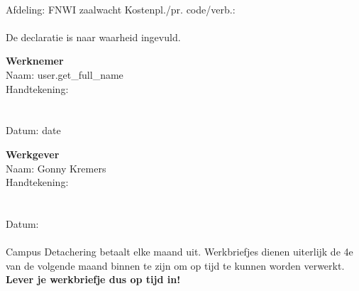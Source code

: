 \documentclass[a4paper,twoside]{article}
\begin{document}
		\paragraph{}

			Afdeling: FNWI zaalwacht Kostenpl./pr. code/verb.:

		\paragraph{}

			De declaratie is naar waarheid ingevuld.

			\begin{multicols}{2}
				\textbf{Werknemer}
				\\
				Naam: {{ user.get_full_name }}
				\\
				Handtekening:
				\\
				\\
				\\
				Datum: {{ date }}

			\columnbreak
				\textbf{Werkgever}
				\\
				Naam: Gonny Kremers
				\\
				Handtekening:
				\\
				\\
				\\
				Datum:

			\end{multicols}

		\paragraph{}

			Campus Detachering betaalt elke maand uit. Werkbriefjes dienen uiterlijk de 4e van de volgende maand binnen te zijn om op tijd te kunnen worden verwerkt. {\bfseries Lever je werkbriefje dus op tijd in!}
\end{document}
